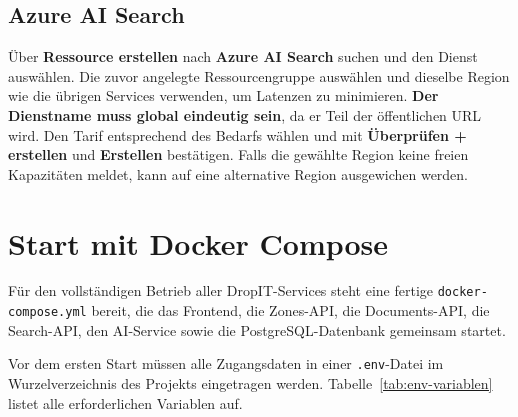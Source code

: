 \subsection{Azure AI Search}
 
Über \textbf{Ressource erstellen} nach \textbf{Azure AI Search} suchen
und den Dienst auswählen. Die zuvor angelegte Ressourcengruppe auswählen
und dieselbe Region wie die übrigen Services verwenden, um Latenzen zu
minimieren. \textbf{Der Dienstname muss global eindeutig sein}, da er
Teil der öffentlichen URL wird. Den Tarif entsprechend des Bedarfs wählen
und mit \textbf{Überprüfen + erstellen} und \textbf{Erstellen} bestätigen.
Falls die gewählte Region keine freien Kapazitäten meldet, kann auf eine
alternative Region ausgewichen werden.
 
\section{Start mit Docker Compose}
 
Für den vollständigen Betrieb aller DropIT-Services steht eine fertige
\texttt{docker-compose.yml} bereit, die das Frontend, die Zones-API,
die Documents-API, die Search-API, den AI-Service sowie die
PostgreSQL-Datenbank gemeinsam startet.
 
Vor dem ersten Start müssen alle Zugangsdaten in einer \texttt{.env}-Datei
im Wurzelverzeichnis des Projekts eingetragen werden.
Tabelle~\ref{tab:env-variablen} listet alle erforderlichen Variablen auf.
 
